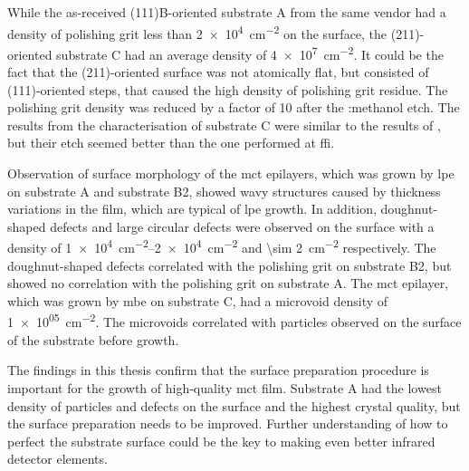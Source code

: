 While the as-received (111)B-oriented substrate A from the same vendor had a density of polishing grit less than \SI{2e4}{\centi\metre^{-2}} on the surface, the (211)-oriented substrate C had an average density of \SI{4e7}{\centi\metre^{-2}}. It could be the fact that the (211)-oriented surface was not atomically flat, but consisted of (111)-oriented steps, that caused the high density of polishing grit residue. The polishing grit density was reduced by a factor of 10 after the :methanol etch. The results from the characterisation of substrate C were similar to the results of \citeauthor{benson2016analysis}, but their etch seemed better than the one performed at \ac{ffi}.

Observation of surface morphology of the \ac{mct} epilayers, which was grown by \ac{lpe} on substrate A and substrate B2, showed wavy structures caused by thickness variations in the film, which are typical of \ac{lpe} growth. In addition, doughnut-shaped defects and large circular defects were observed on the surface with a density of \SIrange{1e4}{2e4}{\centi\metre^{-2}} and \SI{\sim 2}{\centi\metre^{-2}} respectively. The doughnut-shaped defects correlated with the polishing grit on substrate B2, but showed no correlation with the polishing grit on substrate A. The \ac{mct} epilayer, which was grown by \ac{mbe} on substrate C, had a microvoid density of \SI{1e+05}{\centi\metre^{-2}}. The microvoids correlated with particles observed on the surface of the substrate before growth.

The findings in this thesis confirm that the surface preparation procedure is important for the growth of high-quality \ac{mct} film. Substrate A had the lowest density of particles and defects on the surface and the highest crystal quality, but the surface preparation needs to be improved. Further understanding of how to perfect the substrate surface could be the key to making even better infrared detector elements.








